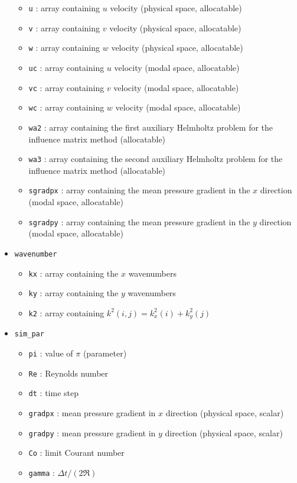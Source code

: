 \begin{itemize}
\begin{itemize}
\item \texttt{u} : array containing $u$ velocity (physical space, allocatable)
\item \texttt{v} : array containing $v$ velocity (physical space, allocatable)
\item \texttt{w} : array containing $w$ velocity (physical space, allocatable)
\item \texttt{uc} : array containing $u$ velocity (modal space, allocatable)
\item \texttt{vc} : array containing $v$ velocity (modal space, allocatable)
\item \texttt{wc} : array containing $w$ velocity (modal space, allocatable)
\item \texttt{wa2} : array containing the first auxiliary Helmholtz problem for the influence matrix method (allocatable)
\item \texttt{wa3} : array containing the second auxiliary Helmholtz problem for the influence matrix method (allocatable)
\item \texttt{sgradpx} : array containing the mean pressure gradient in the $x$ direction (modal space, allocatable)
\item \texttt{sgradpy} : array containing the mean pressure gradient in the $y$ direction (modal space, allocatable)
\end{itemize}
\item \texttt{wavenumber}
\begin{itemize}
\item \texttt{kx} : array containing the $x$ wavenumbers
\item \texttt{ky} : array containing the $y$ wavenumbers
\item \texttt{k2} : array containing $k^2(i,j)=k_x^2(i)+k_y^2(j)$
\end{itemize}
\item \texttt{sim\_par}
\begin{itemize}
\item \texttt{pi} : value of $\pi$ (parameter)
\item \texttt{Re} : Reynolds number
\item \texttt{dt} : time step
\item \texttt{gradpx} : mean pressure gradient in $x$ direction (physical space, scalar)
\item \texttt{gradpy} : mean pressure gradient in $y$ direction (physical space, scalar)
\item \texttt{Co} : limit Courant number
\item \texttt{gamma} : $\Delta t/(2\Re)$

\end{itemize}
\end{itemize}
